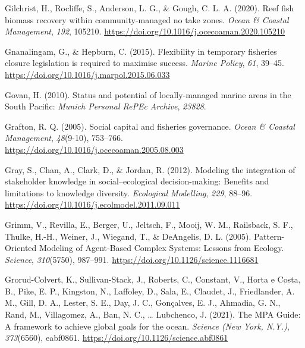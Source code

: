 \documentclass[
]{article}
\newlength{\cslhangindent}
\newlength{\cslentryspacingunit} %
\newenvironment{CSLReferences}[2] %
 {%
  \setlength{\parindent}{0pt}
  \ifodd #1
  \let\oldpar\par
  \def\par{\hangindent=\cslhangindent\oldpar}
  \fi
  \setlength{\parskip}{#2\cslentryspacingunit}
 }%
 {}
\begin{document}
\begin{CSLReferences}{1}{0}
\leavevmode{}%
Gilchrist, H., Rocliffe, S., Anderson, L. G., \& Gough, C. L. A. (2020). Reef fish biomass recovery within community-managed no take zones. \emph{Ocean \& Coastal Management}, \emph{192}, 105210. \url{https://doi.org/10.1016/j.ocecoaman.2020.105210}

\leavevmode{}%
Gnanalingam, G., \& Hepburn, C. (2015). Flexibility in temporary fisheries closure legislation is required to maximise success. \emph{Marine Policy}, \emph{61}, 39--45. \url{https://doi.org/10.1016/j.marpol.2015.06.033}

\leavevmode{}%
Govan, H. (2010). Status and potential of locally-managed marine areas in the {South} {Pacific}: \emph{Munich Personal RePEc Archive}, \emph{23828}.

\leavevmode{}%
Grafton, R. Q. (2005). Social capital and fisheries governance. \emph{Ocean \& Coastal Management}, \emph{48}(9-10), 753--766. \url{https://doi.org/10.1016/j.ocecoaman.2005.08.003}

\leavevmode{}%
Gray, S., Chan, A., Clark, D., \& Jordan, R. (2012). Modeling the integration of stakeholder knowledge in social--ecological decision-making: {Benefits} and limitations to knowledge diversity. \emph{Ecological Modelling}, \emph{229}, 88--96. \url{https://doi.org/10.1016/j.ecolmodel.2011.09.011}

\leavevmode{}%
Grimm, V., Revilla, E., Berger, U., Jeltsch, F., Mooij, W. M., Railsback, S. F., Thulke, H.-H., Weiner, J., Wiegand, T., \& DeAngelis, D. L. (2005). Pattern-{Oriented} {Modeling} of {Agent}-{Based} {Complex} {Systems}: {Lessons} from {Ecology}. \emph{Science}, \emph{310}(5750), 987--991. \url{https://doi.org/10.1126/science.1116681}

\leavevmode{}%
Grorud-Colvert, K., Sullivan-Stack, J., Roberts, C., Constant, V., Horta e Costa, B., Pike, E. P., Kingston, N., Laffoley, D., Sala, E., Claudet, J., Friedlander, A. M., Gill, D. A., Lester, S. E., Day, J. C., Gonçalves, E. J., Ahmadia, G. N., Rand, M., Villagomez, A., Ban, N. C., \ldots{} Lubchenco, J. (2021). The {MPA} {Guide}: {A} framework to achieve global goals for the ocean. \emph{Science (New York, N.Y.)}, \emph{373}(6560), eabf0861. \url{https://doi.org/10.1126/science.abf0861}


\end{CSLReferences}
\end{document}
